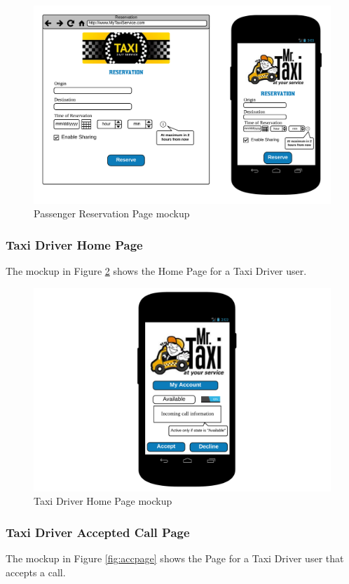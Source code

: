 \begin{figure}[htbp]
\centering
\includegraphics[width=\textwidth]{cpt/img/PassRes}
\caption{Passenger Reservation Page mockup}
\label{fig:res}
\end{figure}
\clearpage

\subsubsection{Taxi Driver Home Page}
The mockup in Figure \ref{fig:drivhome} shows the Home Page for a Taxi Driver user.

\begin{figure}[htbp]
\centering
\includegraphics[width=\textwidth]{cpt/img/DriverHome}
\caption{Taxi Driver Home Page mockup}
\label{fig:drivhome}
\end{figure}
\clearpage

\subsubsection{Taxi Driver Accepted Call Page}
The mockup in Figure \ref{fig:accpage} shows the Page for a Taxi Driver user that accepts a call.

